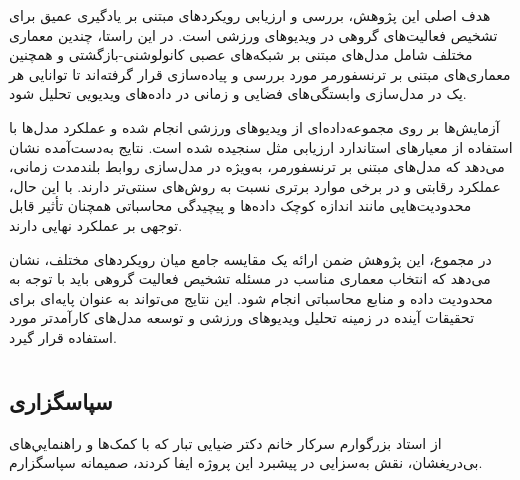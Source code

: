 \documentclass[12pt]{report}
\begin{document}
هدف اصلی این پژوهش، بررسی و ارزیابی رویکردهای مبتنی بر یادگیری عمیق برای تشخیص فعالیت‌های گروهی در ویدیوهای ورزشی است. در این راستا، چندین معماری مختلف شامل مدل‌های مبتنی بر شبکه‌های عصبی کانولوشنی-بازگشتی و همچنین معماری‌های مبتنی بر ترنسفورمر مورد بررسی و پیاده‌سازی قرار گرفته‌اند تا توانایی هر یک در مدل‌سازی وابستگی‌های فضایی و زمانی در داده‌های ویدیویی تحلیل شود.

آزمایش‌ها بر روی مجموعه‌داده‌ای از ویدیوهای ورزشی انجام شده و عملکرد مدل‌ها با استفاده از معیارهای استاندارد ارزیابی مثل  سنجیده شده است. نتایج به‌دست‌آمده نشان می‌دهد که مدل‌های مبتنی بر ترنسفورمر، به‌ویژه در مدل‌سازی روابط بلندمدت زمانی، عملکرد رقابتی و در برخی موارد برتری نسبت به روش‌های سنتی‌تر دارند. با این حال، محدودیت‌هایی مانند اندازه کوچک داده‌ها و پیچیدگی محاسباتی همچنان تأثیر قابل توجهی بر عملکرد نهایی دارند.

در مجموع، این پژوهش ضمن ارائه یک مقایسه جامع میان رویکردهای مختلف، نشان می‌دهد که انتخاب معماری مناسب در مسئله تشخیص فعالیت گروهی باید با توجه به محدودیت داده و منابع محاسباتی انجام شود. این نتایج می‌تواند به عنوان پایه‌ای برای تحقیقات آینده در زمینه تحلیل ویدیوهای ورزشی و توسعه مدل‌های کارآمدتر مورد استفاده قرار گیرد.



\chapter*{}
\section*{سپاسگزاری}
از استاد بزرگوارم سرکار خانم دکتر ضیایی تبار که با کمک‌ها و راهنمایي‌های بی‌دریغشان، نقش
به‌سزایی در پیشبرد این پروژه ایفا کردند، صمیمانه سپاسگزارم.


\end{document}
